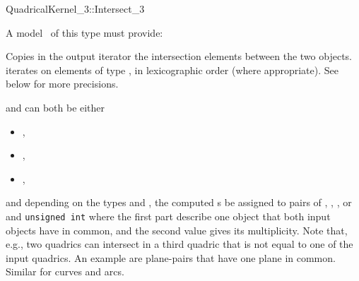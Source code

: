 
\begin{ccRefFunctionObjectConcept}{QuadricalKernel_3::Intersect_3}

\ccRefines



A model \ccVar\ of this type must provide:

{Copies in the output iterator the intersection elements between the
two objects.  iterates on
elements of type , in lexicographic order
(where appropriate). See below for more precisions.}


 and  can both 
be either

\begin{itemize}
\item {} ,
\item {} ,
\item {} ,
\end{itemize} 

and depending on the types  and , the computed 
s be assigned to pairs of
, , , or 
and {\tt unsigned int} where the first part describe
one object that both input objects have in common, and the second
value gives its multiplicity. Note that, e.g., two quadrics
can intersect in a third quadric that is not equal to one of the input
quadrics. An example are plane-pairs that have one plane in common.
Similar for curves and arcs.

\end{ccRefFunctionObjectConcept}
